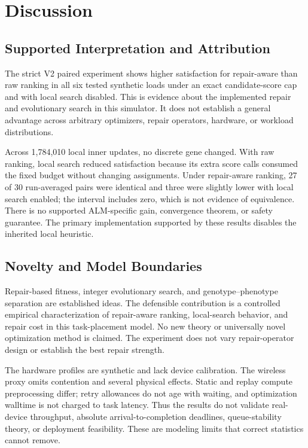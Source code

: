 \documentclass[pdflatex,sn-mathphys-num]{sn-jnl}
\begin{document}


\section{Discussion}
\subsection{Supported Interpretation and Attribution}
The strict V2 paired experiment shows higher satisfaction for repair-aware than raw ranking in all six tested synthetic loads under an exact candidate-score cap and with local search disabled. This is evidence about the implemented repair and evolutionary search in this simulator. It does not establish a general advantage across arbitrary optimizers, repair operators, hardware, or workload distributions.

Across 1,784,010 local inner updates, no discrete gene changed. With raw ranking, local search reduced satisfaction because its extra score calls consumed the fixed budget without changing assignments. Under repair-aware ranking, 27 of 30 run-averaged pairs were identical and three were slightly lower with local search enabled; the interval includes zero, which is not evidence of equivalence. There is no supported ALM-specific gain, convergence theorem, or safety guarantee. The primary implementation supported by these results disables the inherited local heuristic.

\subsection{Novelty and Model Boundaries}
Repair-based fitness, integer evolutionary search, and genotype--phenotype separation are established ideas. The defensible contribution is a controlled empirical characterization of repair-aware ranking, local-search behavior, and repair cost in this task-placement model. No new theory or universally novel optimization method is claimed. The experiment does not vary repair-operator design or establish the best repair strength.

The hardware profiles are synthetic and lack device calibration. The wireless proxy omits contention and several physical effects. Static and replay compute preprocessing differ; retry allowances do not age with waiting, and optimization walltime is not charged to task latency. Thus the results do not validate real-device throughput, absolute arrival-to-completion deadlines, queue-stability theory, or deployment feasibility. These are modeling limits that correct statistics cannot remove.
\end{document}
